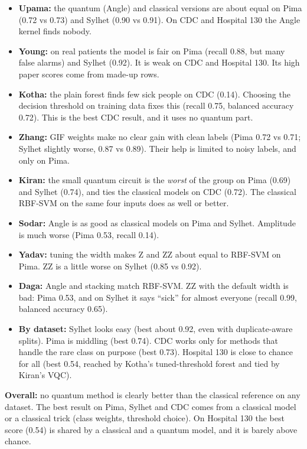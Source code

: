 \documentclass[11pt,a4paper]{article}
\begin{document}
\begin{itemize}[leftmargin=1.5em]
\item \textbf{Upama:} the quantum (Angle) and classical versions are about equal on Pima (0.72 vs 0.73) and Sylhet (0.90 vs 0.91). On CDC and Hospital 130 the Angle kernel finds nobody.
\item \textbf{Young:} on real patients the model is fair on Pima (recall 0.88, but many false alarms) and Sylhet (0.92). It is weak on CDC and Hospital 130. Its high paper scores come from made-up rows.
\item \textbf{Kotha:} the plain forest finds few sick people on CDC (0.14). Choosing the decision threshold on training data fixes this (recall 0.75, balanced accuracy 0.72). This is the best CDC result, and it uses no quantum part.
\item \textbf{Zhang:} GIF weights make no clear gain with clean labels (Pima 0.72 vs 0.71; Sylhet slightly worse, 0.87 vs 0.89). Their help is limited to noisy labels, and only on Pima.
\item \textbf{Kiran:} the small quantum circuit is the \emph{worst} of the group on Pima (0.69) and Sylhet (0.74), and ties the classical models on CDC (0.72). The classical RBF-SVM on the same four inputs does as well or better.
\item \textbf{Sodar:} Angle is as good as classical models on Pima and Sylhet. Amplitude is much worse (Pima 0.53, recall 0.14).
\item \textbf{Yadav:} tuning the width makes Z and ZZ about equal to RBF-SVM on Pima. ZZ is a little worse on Sylhet (0.85 vs 0.92).
\item \textbf{Daga:} Angle and stacking match RBF-SVM. ZZ with the default width is bad: Pima 0.53, and on Sylhet it says ``sick'' for almost everyone (recall 0.99, balanced accuracy 0.65).
\item \textbf{By dataset:} Sylhet looks easy (best about 0.92, even with duplicate-aware splits). Pima is middling (best 0.74). CDC works only for methods that handle the rare class on purpose (best 0.73). Hospital 130 is close to chance for all (best 0.54, reached by Kotha's tuned-threshold forest and tied by Kiran's VQC).
\end{itemize}
\textbf{Overall:} no quantum method is clearly better than the classical reference on any dataset. The best result on Pima, Sylhet and CDC comes from a classical model or a classical trick (class weights, threshold choice). On Hospital 130 the best score (0.54) is shared by a classical and a quantum model, and it is barely above chance.
\end{document}
